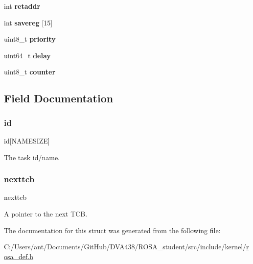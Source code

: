 \begin{DoxyCompactItemize}
int {\bfseries retaddr}
\item 
\mbox{\label{structtcb__record__t_ab62fb376bbf1ce34b1d962f24e46b825}} 
int {\bfseries savereg} \mbox{[}15\mbox{]}
\item 
\mbox{\label{structtcb__record__t_a0ad043071ccc7a261d79a759dc9c6f0c}} 
uint8\+\_\+t {\bfseries priority}
\item 
\mbox{\label{structtcb__record__t_a8c0b95ab06c950bd9afd8444922d98a3}} 
uint64\+\_\+t {\bfseries delay}
\item 
\mbox{\label{structtcb__record__t_a0480b812cba9c1d9c71a5fb1071bd0fc}} 
uint8\+\_\+t {\bfseries counter}
\end{DoxyCompactItemize}


\subsection{Field Documentation}
\mbox{\label{structtcb__record__t_aa25efaaaecf8c7c4d679dbc94aec3031}} 
\subsubsection{\texorpdfstring{id}{id}}
{\footnotesize\ttfamily id\mbox{[}N\+A\+M\+E\+S\+I\+ZE\mbox{]}}

The task id/name. \mbox{\label{structtcb__record__t_abe5f58939c000c4f6b06c911bead561c}} 
\subsubsection{\texorpdfstring{nexttcb}{nexttcb}}
{\footnotesize\ttfamily nexttcb}

A pointer to the next T\+CB. 

The documentation for this struct was generated from the following file\+:\begin{DoxyCompactItemize}
\item 
C\+:/\+Users/ant/\+Documents/\+Git\+Hub/\+D\+V\+A438/\+R\+O\+S\+A\+\_\+student/src/include/kernel/\mbox{\hyperlink{rosa__def_8h}{rosa\+\_\+def.\+h}}\end{DoxyCompactItemize}

